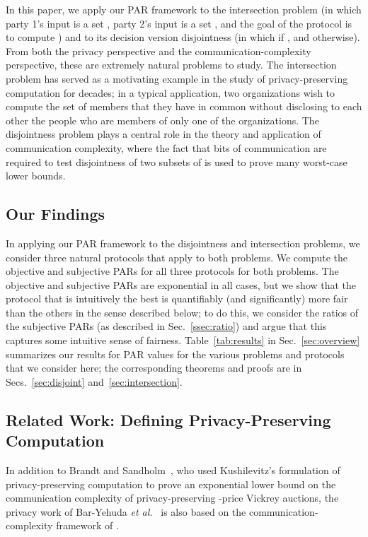 \documentclass{article}
\theoremstyle{theorem}
\theoremstyle{definition}
\theoremstyle{remark}
\begin{document}
In this paper, we apply our PAR framework to the intersection problem (in which party 1's input
is a set , party 2's input is a set , and the goal of the protocol is to compute
) and to its decision version disjointness (in which  if
, and  otherwise).  From both the privacy perspective
and the communication-complexity perspective, these are extremely natural problems to study.
The intersection problem has served as a motivating example in the study of privacy-preserving
computation for decades; in a typical application, two organizations wish to compute the set of
members that they have in common without disclosing to each other the people who are members of
only one of the organizations.  The disjointness problem plays a central role in the theory and
application of communication complexity, where the fact that  bits of communication are
required to test disjointness of two subsets of  is used to prove many
worst-case lower bounds.

\subsection{Our Findings}



In applying our PAR framework to the disjointness and intersection problems, we consider three natural
protocols that apply to both problems.  We compute the objective and subjective PARs for all three protocols for both problems.  The objective and subjective PARs are
exponential in all cases, but we show that the protocol that is intuitively the
best is quantifiably (and significantly) more fair than the others in the sense
described below; to do this, we consider the ratios of the subjective PARs (as described in Sec.~\ref{ssec:ratio}) and argue that this captures some intuitive sense of fairness.  Table~\ref{tab:results} in Sec.~\ref{sec:overview} summarizes our
results for PAR values for the various problems and protocols that we consider here; the corresponding theorems and proofs are in Secs.~\ref{sec:disjoint} and~\ref{sec:intersection}.



\subsection{Related Work: Defining Privacy-Preserving
Computation}

In addition to Brandt and Sandholm~\cite{BS}, who used Kushilevitz's formulation of privacy-preserving
computation to prove an exponential lower bound on the communication complexity of
privacy-preserving -price Vickrey auctions, the privacy work of Bar-Yehuda {\it et
al.}~\cite{BCKO} is also based on the communication-complexity framework of \cite{CK91,K92}.
\end{document}
